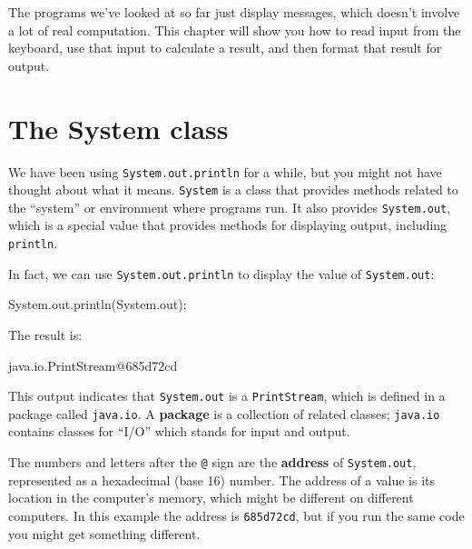 \documentclass[12pt]{book}
\theoremstyle{exercise}
\newcommand{\java}[1]{\verb"#1"}
\begin{document}


The programs we've looked at so far just display messages, which doesn't involve a lot of real computation.
This chapter will show you how to read input from the keyboard, use that input to calculate a result, and then format that result for output.


\section{The System class}
\label{sec:system}


We have been using {\tt System.out.println} for a while, but you might not have thought about what it means.
\java{System} is a class that provides methods related to the ``system'' or environment where programs run.
It also provides \java{System.out}, which is a special value that provides methods for displaying output, including \java{println}.

In fact, we can use \java{System.out.println} to display the value of \java{System.out}:

\begin{code}
System.out.println(System.out);
\end{code}

The result is:

\begin{stdout}
java.io.PrintStream@685d72cd
\end{stdout}



This output indicates that \java{System.out} is a \java{PrintStream}, which is defined in a package called \java{java.io}.
A {\bf package} is a collection of related classes; \java{java.io} contains classes for ``I/O'' which stands for input and output.


The numbers and letters after the {\tt @} sign are the {\bf address} of \java{System.out}, represented as a hexadecimal (base 16) number.
The address of a value is its location in the computer's memory, which might be different on different computers.
In this example the address is \java{685d72cd}, but if you run the same code you might get something different.
\end{document}
